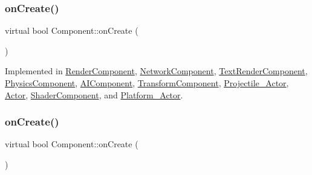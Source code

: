 \subsubsection{\texorpdfstring{on\+Create()}{onCreate()}\hspace{0.1cm}{\footnotesize\ttfamily [1/2]}}
{\footnotesize\ttfamily virtual bool Component\+::on\+Create (\begin{DoxyParamCaption}{ }\end{DoxyParamCaption})\hspace{0.3cm}{\ttfamily [pure virtual]}}



Implemented in \hyperlink{classRenderComponent_a5ecc72f2a9249c4df22365dbe7ca49b0}{Render\+Component}, \hyperlink{classNetworkComponent_afe34eefd95bb82a8496c856a19e0f153}{Network\+Component}, \hyperlink{classTextRenderComponent_aafaf33608a83d1ff4af66ef53ba81b29}{Text\+Render\+Component}, \hyperlink{classPhysicsComponent_ad797a2708cfc3c0e88a44341121f594d}{Physics\+Component}, \hyperlink{classAIComponent_a1f7e2f748183cbcba9e3f351025b862c}{A\+I\+Component}, \hyperlink{classTransformComponent_aef9e192f10ac612d6b146136603b3293}{Transform\+Component}, \hyperlink{classProjectile__Actor_a98e2e2198cd164c35318c04f96e6a3ac}{Projectile\+\_\+\+Actor}, \hyperlink{classActor_a56a241c949adf52cedceb45a7102ea1a}{Actor}, \hyperlink{classShaderComponent_a0c42362c7ba178050551e7451b49abe5}{Shader\+Component}, and \hyperlink{classPlatform__Actor_ab902e2540f1d3127dedff632841b4921}{Platform\+\_\+\+Actor}.

\mbox{\label{classComponent_a3a1537a8b8bcdb2155afbb925c77b0a2}} 
\subsubsection{\texorpdfstring{on\+Create()}{onCreate()}\hspace{0.1cm}{\footnotesize\ttfamily [2/2]}}
{\footnotesize\ttfamily virtual bool Component\+::on\+Create (\begin{DoxyParamCaption}{ }\end{DoxyParamCaption})\hspace{0.3cm}{\ttfamily [pure virtual]}}



